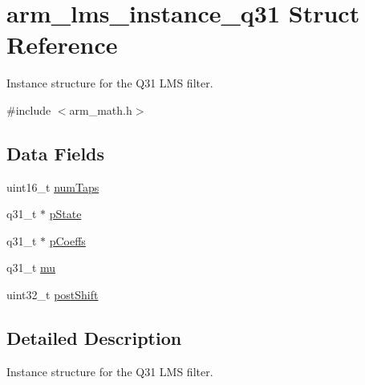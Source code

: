 \hypertarget{structarm__lms__instance__q31}{\section{arm\-\_\-lms\-\_\-instance\-\_\-q31 Struct Reference}
\label{structarm__lms__instance__q31}
}


Instance structure for the Q31 L\-M\-S filter.  




{\ttfamily \#include $<$arm\-\_\-math.\-h$>$}

\subsection*{Data Fields}
\begin{DoxyCompactItemize}
\item 
uint16\-\_\-t \hyperlink{structarm__lms__instance__q31_a751941891e47f522a7f5375fe8990aac}{num\-Taps}
\item 
q31\-\_\-t $\ast$ \hyperlink{structarm__lms__instance__q31_adee4ba3ee8869865af7d8fa08ca913d6}{p\-State}
\item 
q31\-\_\-t $\ast$ \hyperlink{structarm__lms__instance__q31_a68888e36167d81cb7836db10367a1682}{p\-Coeffs}
\item 
q31\-\_\-t \hyperlink{structarm__lms__instance__q31_a21ab4237a726ea7751f5026d89d2e577}{mu}
\item 
uint32\-\_\-t \hyperlink{structarm__lms__instance__q31_aa2cacddfc5e1d86905d7d31a18b1979b}{post\-Shift}
\end{DoxyCompactItemize}


\subsection{Detailed Description}
Instance structure for the Q31 L\-M\-S filter. 

